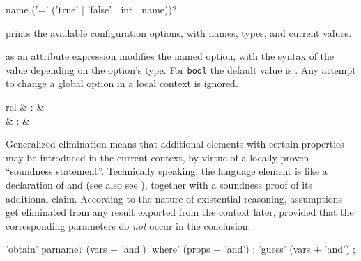 \begin{isabellebody}
\begin{isamarkuptext}
  \begin{rail}
    name ('=' ('true' | 'false' | int | name))?
  \end{rail}

  \begin{descr}
  
  \item [\mbox{\isa{\isacommand{print{\isacharunderscore}configs}}}] prints the available
  configuration options, with names, types, and current values.
  
  \item [\isa{name\ {\isacharequal}\ value}] as an attribute expression modifies
  the named option, with the syntax of the value depending on the
  option's type.  For \verb|bool| the default value is .  Any attempt to change a global option in a local context is
  ignored.

  \end{descr}%
\end{isamarkuptext}%
\isamarkuptrue%
%
\isamarkuptrue%
%
\isamarkuptrue%
%
\begin{isamarkuptext}%
\begin{matharray}{rcl}
    \mbox{} & : &  \\
    \mbox{}\isa{\isactrlsup {\isacharasterisk}} & : &  \\
  \end{matharray}

  Generalized elimination means that additional elements with certain
  properties may be introduced in the current context, by virtue of a
  locally proven ``soundness statement''.  Technically speaking, the
  \mbox{} language element is like a declaration of
  \mbox{} and \mbox{} (see also see
  ), together with a soundness proof of its
  additional claim.  According to the nature of existential reasoning,
  assumptions get eliminated from any result exported from the context
  later, provided that the corresponding parameters do \emph{not}
  occur in the conclusion.

  \begin{rail}
    'obtain' parname? (vars + 'and') 'where' (props + 'and')
    ;
    'guess' (vars + 'and')
    ;
  \end{rail}


\end{isamarkuptext}
\end{isabellebody}
